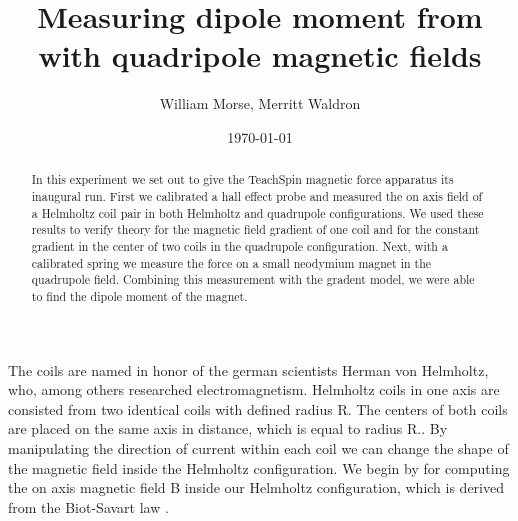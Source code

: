 \documentclass[aps,twocolumn,secnumarabic,balancelastpage,amsmath,amssymb,nofootinbib,floatfix]{revtex4-1}
\begin{document}
\title{Measuring dipole moment from with quadripole magnetic fields}
\author{William Morse, Merritt Waldron}
\date{\today}

\begin{abstract} 
In this experiment we set out to give the TeachSpin magnetic force apparatus its inaugural run. First we calibrated a hall effect probe and measured the on axis field of a Helmholtz coil pair in both Helmholtz and quadrupole configurations. We used these results to verify theory for the magnetic field gradient of one coil and for the constant gradient in the center of two coils in the quadrupole configuration. Next, with a calibrated spring we measure the force on a small neodymium magnet in the quadrupole field. Combining this measurement with the gradent model, we were able to find the dipole moment of the magnet. 
\end{abstract}


\maketitle
The coils are named in honor of the german scientists Herman von Helmholtz, who, among others researched electromagnetism. Helmholtz coils in one axis are consisted from two identical coils with defined radius R. The centers of both coils are placed on the same axis in distance, which is equal to radius R.\cite{Math}. By manipulating the direction of current within each coil we can change the shape of the magnetic field inside the Helmholtz configuration. We begin by for computing the on axis magnetic field B inside our Helmholtz configuration, which is derived from the Biot-Savart law \cite{Knight}.
\end{document}
